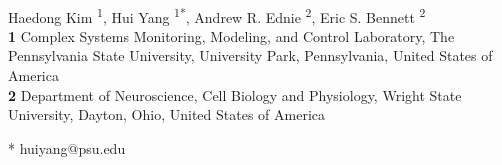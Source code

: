 \documentclass[10pt,letterpaper]{article}
\begin{document}
\vspace*{0.2in}

\begin{flushleft}
{\Large
\textbf{} %
}
\newline
\\
Haedong Kim \textsuperscript{1},
Hui Yang \textsuperscript{1*},
Andrew R. Ednie \textsuperscript{2},
Eric S. Bennett \textsuperscript{2}
\\
\bigskip
\textbf{1} Complex Systems Monitoring, Modeling, and Control Laboratory, The Pennsylvania State University, University Park, Pennsylvania, United States of America
\\
\textbf{2} Department of Neuroscience, Cell Biology and Physiology, Wright State University, Dayton, Ohio, United States of America
\\
\bigskip

% 
%





* huiyang@psu.edu

\end{flushleft}
\end{document}
